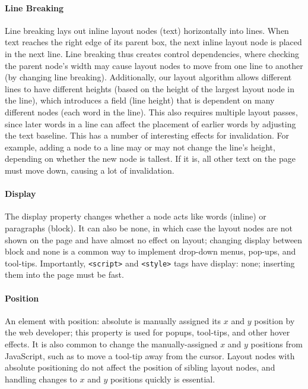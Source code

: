\paragraph{Line Breaking}
Line breaking lays out inline layout nodes (text)
  horizontally into lines.
When text reaches the right edge of its parent box,
  the next inline layout node is placed in the next line.
Line breaking thus creates control dependencies,
  where checking the parent node's width may cause layout nodes
  to move from one line to another (by changing line breaking).
Additionally, our layout algorithm
  allows different lines to have different heights
  (based on the height of the largest layout node in the line),
  which introduces a field (line height)
  that is dependent on many different nodes (each word in the line).
This also requires multiple layout passes,
  since later words in a line
  can affect the placement of earlier words
  by adjusting the text baseline.
This has a number of interesting effects for invalidation.
For example, adding a node to a line
  may or may not change the line's height,
  depending on whether the new node is tallest.
If it is, all other text on the page must move down,
  causing a lot of invalidation.

\paragraph{Display}
The \textsf{display} property changes
  whether a node acts like words (\textsf{inline})
  or paragraphs (\textsf{block}).
It can also be \textsf{none},
  in which case the layout nodes are not shown on the page
  and have almost no effect on layout;
  changing \textsf{display} between \textsf{block} and \textsf{none}
  is a common way to implement drop-down menus, pop-ups, and tool-tips.
Importantly, \texttt{<script>} and \texttt{<style>} tags
  have \textsf{display: none};
  inserting them into the page must be fast.

\paragraph{Position}
An element with \textsf{position: absolute}
  is manually assigned its $x$ and $y$ position by the web developer;
  this property is used for popups, tool-tips, and other hover effects.
It is also common
  to change the manually-assigned $x$ and $y$ positions
  from JavaScript, such as to move a tool-tip away from the cursor.
Layout nodes with absolute positioning do not affect
  the position of sibling layout nodes,
  and handling changes to $x$ and $y$ positions quickly is essential.

